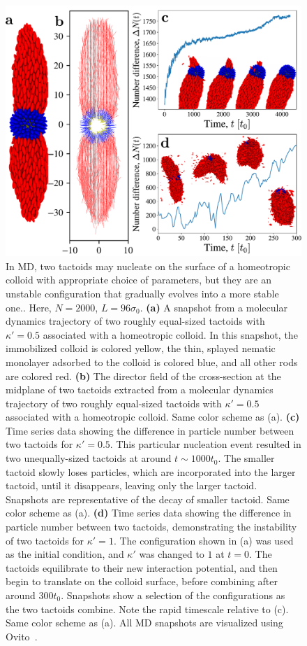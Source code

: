 \documentclass[%
 aip,
 amsmath,amssymb,
 reprint,%
]{revtex4-1}
\begin{document}
\begin{figure}
\centering
\includegraphics[scale=0.67]{media/190718-fig2-nice-v1.pdf}
\caption{In MD, two tactoids may nucleate on the surface of a homeotropic colloid with appropriate choice of parameters, but they are an unstable configuration that gradually evolves into a more stable one.. Here, $N=2000$, $L=96\sigma_0$. \textbf{(a)} A snapshot from a molecular dynamics trajectory of two roughly equal-sized tactoids with $\kappa'=0.5$ associated with a homeotropic colloid. In this snapshot, the immobilized colloid is colored yellow, the thin, splayed nematic monolayer adsorbed to the colloid is colored blue, and all other rods are colored red. \textbf{(b)} The director field of the cross-section at the midplane of two tactoids extracted from a molecular dynamics trajectory of two roughly equal-sized tactoids with $\kappa'=0.5$ associated with a homeotropic colloid. Same color scheme as (a). \textbf{(c)} Time series data showing the difference in particle number between two tactoids for $\kappa'=0.5$. This particular nucleation event resulted in two unequally-sized tactoids at around $t\sim 1000 t_0$. The smaller tactoid slowly loses particles, which are incorporated into the larger tactoid, until it disappears, leaving only the larger tactoid. Snapshots are representative of the decay of smaller tactoid. Same color scheme as (a). \textbf{(d)} Time series data showing the difference in particle number between two tactoids, demonstrating the instability of two tactoids for $\kappa'=1$. The configuration shown in (a) was used as the initial condition, and $\kappa'$ was changed to $1$ at $t=0$. The tactoids equilibrate to their new interaction potential, and then begin to translate on the colloid surface, before combining after around $300 t_0$. Snapshots show a selection of the configurations as the two tactoids combine. Note the rapid timescale relative to (c). Same color scheme as (a). All MD snapshots are visualized using Ovito~\cite{Ovito}.}
\label{fig:tactoidDistributionsTimeSeries}
\end{figure}
\end{document}
